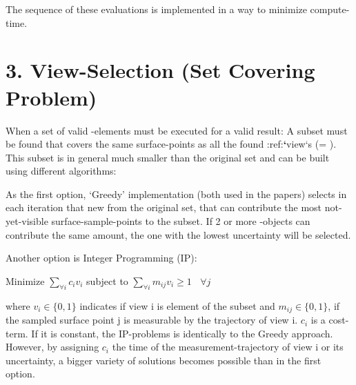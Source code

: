 \documentclass[letterpaper,10pt,english]{sphinxmanual}
\begin{document}
\begin{figure}[htbp]
\centering

\noindent{}
\end{figure}

The sequence of these evaluations is implemented in a way to minimize compute-time.


\section{3. View-Selection (Set Covering Problem)}
\label{\detokenize{view_planning_detailed:view-selection-set-covering-problem}}
When a set of valid -elements must be executed for a valid result: A subset must be found that
covers the same surface-points as all the found :ref:{\color{red}\bfseries{}{}`}view{}`s (= ). This subset is in general much smaller than the original set and can be built using different algorithms:

As the first option, ‘Greedy’ implementation (both used in the papers) selects in each iteration that new {\hyperref[\detokenize{module_view:view}]{}} from the original set, that can contribute the most
not-yet-visible surface-sample-points to the subset. If 2 or more {\hyperref[\detokenize{module_view:view}]{}}-objects can contribute the same amount, the one with the lowest uncertainty will be selected.

Another option is Integer Programming (IP):

Minimize \(\sum_{\forall i} c_i v_i\) subject to \(\sum_{\forall i} m_{ij} v_i \ge 1~~~~\forall j\)

where \(v_i \in \{0,1\}\) indicates if view i is element of the subset and \(m_{ij} \in \{0, 1\}\), if the sampled surface point j is measurable by the trajectory of view i.
\(c_{i}\) is a cost-term. If it is constant, the IP-problems is identically to the Greedy approach. However, by assigning \(c_{i}\) the time of the measurement-trajectory
of view i or its uncertainty, a bigger variety of solutions becomes possible than in the first option.
\end{document}
